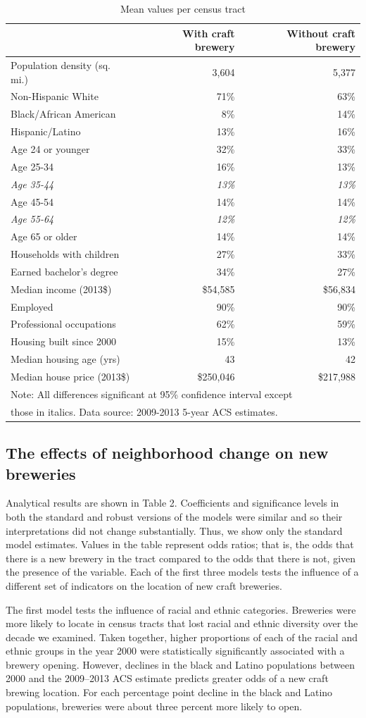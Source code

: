 \documentclass[]{article}
\begin{document}
\begin{longtable}[c]{@{}lrr@{}}
\caption{Mean values per census tract}\\
\toprule
& With craft brewery & Without craft brewery\tabularnewline
\midrule
\endhead
Population density (sq. mi.) & 3,604 & 5,377\tabularnewline
Non-Hispanic White & 71\% & 63\%\tabularnewline
Black/African American & 8\% & 14\%\tabularnewline
Hispanic/Latino & 13\% & 16\%\tabularnewline
Age 24 or younger & 32\% & 33\%\tabularnewline
Age 25-34 & 16\% & 13\%\tabularnewline
\emph{Age 35-44} & \emph{13\%} & \emph{13\%}\tabularnewline
Age 45-54 & 14\% & 14\%\tabularnewline
\emph{Age 55-64} & \emph{12\%} & \emph{12\%}\tabularnewline
Age 65 or older & 14\% & 14\%\tabularnewline
Households with children & 27\% & 33\%\tabularnewline
Earned bachelor's degree & 34\% & 27\%\tabularnewline
Median income (2013\$) & \$54,585 & \$56,834\tabularnewline
Employed & 90\% & 90\%\tabularnewline
Professional occupations & 62\% & 59\%\tabularnewline
Housing built since 2000 & 15\% & 13\%\tabularnewline
Median housing age (yrs) & 43 & 42\tabularnewline
Median house price (2013\$) & \$250,046 & \$217,988\tabularnewline
\bottomrule
\multicolumn{3}{l}{Note: All differences significant at 95\% confidence interval except} \\
\multicolumn{3}{l}{those in italics. Data source: 2009-2013 5-year ACS estimates.}
\end{longtable}

\subsection{The effects of neighborhood change on new
breweries}\label{the-effects-of-neighborhood-change-on-new-breweries}

Analytical results are shown in Table 2. Coefficients and significance
levels in both the standard and robust versions of the models were
similar and so their interpretations did not change substantially. Thus,
we show only the standard model estimates. Values in the table represent
odds ratios; that is, the odds that there is a new brewery in the tract
compared to the odds that there is not, given the presence of the
variable. Each of the first three models tests the influence of a
different set of indicators on the location of new craft breweries.

The first model tests the influence of racial and ethnic categories.
Breweries were more likely to locate in census tracts that lost racial
and ethnic diversity over the decade we examined. Taken together, higher
proportions of each of the racial and ethnic groups in the year 2000
were statistically significantly associated with a brewery opening.
However, declines in the black and Latino populations between 2000 and
the 2009--2013 ACS estimate predicts greater odds of a new craft brewing
location. For each percentage point decline in the black and Latino
populations, breweries were about three percent more likely to open.
\end{document}
